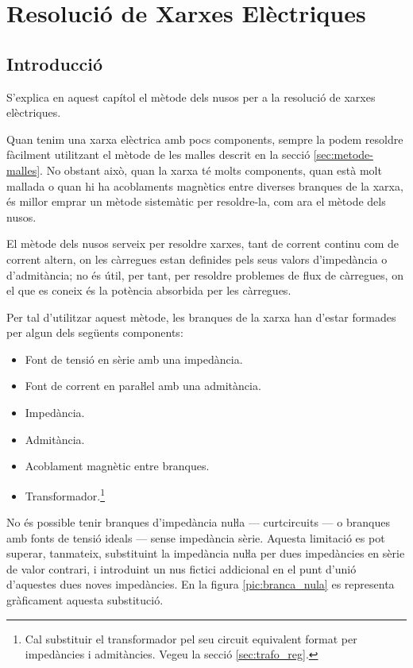 \chapter{Resolució de Xarxes Elèctriques} \label{sec:ch-xarxes-elec}
\section{Introducció}\label{sec:ch-xarxes-elec-intro}
S'explica en aquest capítol el
mètode dels nusos per a la resolució de xarxes elèctriques.

Quan tenim una xarxa elèctrica amb pocs components, sempre la podem resoldre fàcilment
utilitzant el mètode de les malles descrit en la secció \vref{sec:metode-malles}. No obstant això, quan la xarxa té molts components, quan està
 molt mallada o quan hi ha acoblaments magnètics entre diverses branques de la xarxa, és millor
 emprar un mètode sistemàtic per  resoldre-la, com ara el mètode dels nusos.

El mètode dels nusos serveix per resoldre xarxes, tant de corrent
continu com de corrent altern, on les càrregues estan definides pels
seus valors d'impedància o d'admitància; no és útil, per tant, per
resoldre problemes de flux de càrregues, on el que es coneix és la
potència absorbida per les càrregues.

Per tal d'utilitzar aquest mètode, les branques de la xarxa han d'estar
formades per algun dels següents components: \vspace{-1.5mm}
\begin{itemize}
   \item Font de tensió en sèrie amb una impedància.
   \item Font de corrent en paraŀlel amb una admitància.
   \item Impedància.
   \item Admitància.
   \item Acoblament magnètic entre branques.
   \item Transformador.\footnote{Cal substituir el transformador pel seu circuit equivalent format per impedàncies i    admitàncies. Vegeu la secció \ref{sec:trafo_reg}.}
\end{itemize}
\vspace{-1.5mm}

No és possible tenir branques d'impedància nuŀla --- curtcircuits --- o
branques amb fonts de tensió ideals  --- sense impedància sèrie.
Aquesta limitació es pot superar, tanmateix, substituint la
impedància nuŀla per dues impedàncies en sèrie  de valor
contrari, i introduint un nus fictici addicional en el punt d'unió
d'aquestes dues noves impedàncies. En la figura
\vref{pic:branca_nula}
 es representa gràficament aquesta substitució. 
\begin{center}
   
    \label{pic:branca_nula}
\end{center}

